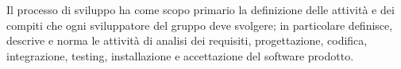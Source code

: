 Il processo di sviluppo ha come scopo primario la definizione delle attivit\`{a} e dei compiti che ogni sviluppatore del gruppo \Gruppo{} deve svolgere; in particolare definisce, descrive e norma le attivit\`{a} di analisi dei requisiti, progettazione, codifica, integrazione, testing, installazione e accettazione del software prodotto.